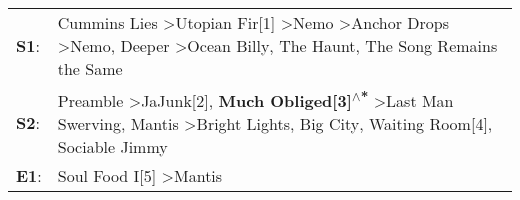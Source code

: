 \begin{supertabular}{p{0.03\textwidth}p{0.92\textwidth}}
 \textbf{S1}:  &  Cummins Lies\textsuperscript{} \textgreater \enspace Utopian Fir[1]\textsuperscript{} \textgreater \enspace Nemo\textsuperscript{} \textgreater \enspace Anchor Drops\textsuperscript{} \textgreater \enspace Nemo\textsuperscript{}, \enspace Deeper\textsuperscript{} \textgreater \enspace Ocean Billy\textsuperscript{}, \enspace The Haunt\textsuperscript{}, \enspace The Song Remains the Same\textsuperscript{}  \enspace  \\
 \textbf{S2}:  &                           Preamble\textsuperscript{} \textgreater \enspace JaJunk[2]\textsuperscript{}, \enspace \textbf{Much Obliged[3]\textsuperscript{$\wedge$*}} \textgreater \enspace Last Man Swerving\textsuperscript{}, \enspace Mantis\textsuperscript{} \textgreater \enspace Bright Lights, Big City\textsuperscript{}, \enspace Waiting Room[4]\textsuperscript{}, \enspace Sociable Jimmy\textsuperscript{}  \enspace  \\
 \textbf{E1}:  &                                                                                                                                                                                                                                                                                                                                          Soul Food I[5]\textsuperscript{} \textgreater \enspace Mantis\textsuperscript{}  \enspace  \\
\end{supertabular}
